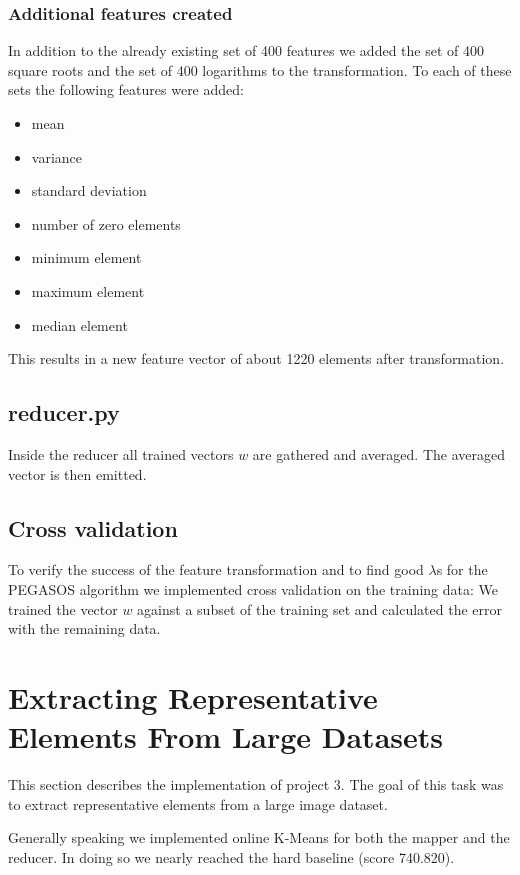 \documentclass[a4paper, 11pt]{article}
\begin{document}
\subsubsection{Additional features created}

In addition to the already existing set of 400 features we added the set of 400
square roots and the set of 400 logarithms to the transformation. To each of
these sets the following features were added:

\begin{itemize}
\item mean
\item variance
\item standard deviation
\item number of zero elements
\item minimum element
\item maximum element
\item median element
\end{itemize}

This results in a new feature vector of about 1220 elements after transformation.

\subsection{reducer.py}

Inside the reducer all trained vectors $w$ are gathered and averaged. The
averaged vector is then emitted.

\subsection{Cross validation}

To verify the success of the feature transformation and to find good $\lambda$s
for the PEGASOS algorithm we implemented cross validation on the training data:
We trained the vector $w$ against a subset of the training set and calculated
the error with the remaining data.

\section{Extracting Representative Elements From Large Datasets}
This section describes the implementation of project 3. The goal of this task was to extract representative elements from a large image dataset.

Generally speaking we implemented online K-Means for both the mapper and the reducer. In doing so we nearly reached the hard baseline (score 740.820).
\end{document}

